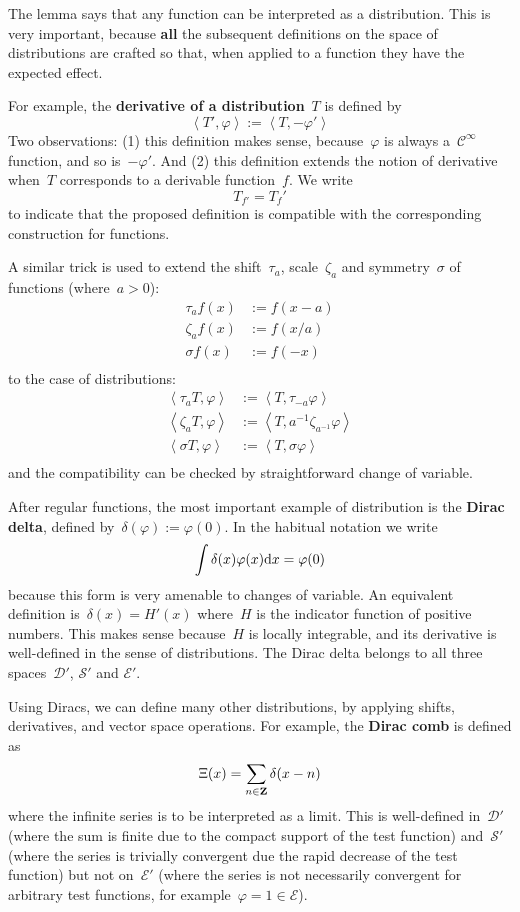 The lemma says that any function can be interpreted as a
distribution.
This is very important, because {\bf all} the subsequent
definitions on the space of distributions are crafted so that, when
applied to a function they have the expected effect.

For example, the {\bf derivative of a distribution}~$T$ is defined by
$$
\left<T',\varphi\right>
:=
\left<T,-\varphi'\right>
$$
Two observations: (1) this definition makes sense, because~$\varphi$
is always a~$\mathcal{C}^\infty$ function, and so is~$-\varphi'$.
And (2) this definition extends the notion of derivative when~$T$
corresponds to a derivable function~$f$.  We write
$$
T_{f'}= {T_f}'
$$
to indicate that the proposed definition is compatible with the
corresponding construction for functions.

A similar trick is used to extend the shift~$\tau_a$, scale~$\zeta_a$ and
symmetry~$\sigma$ of functions (where~$a>0$):
\begin{eqnarray*}
	\tau_a f(x) &:= f(x-a) \\
	\zeta_a f(x) &:= f(x/a) \\
	\sigma f(x) &:= f(-x) \\
\end{eqnarray*}
to the case of distributions:
\begin{eqnarray*}
	\left<\tau_a T,\varphi\right> &:= \left<T,\tau_{-a}\varphi\right> \\
	\left<\zeta_a T,\varphi\right> &:= \left<T,a^{-1}\zeta_{a^{-1}}\varphi\right> \\
	\left<\sigma T,\varphi\right> &:= \left<T,\sigma\varphi\right> \\
\end{eqnarray*}
and the compatibility can be checked by straightforward change of
variable.

After regular functions, the most important example of distribution
is the {\bf Dirac delta}, defined by~$\delta(\varphi):=\varphi(0)$.
In the habitual notation we write
$$
\int\delta(x)\varphi(x)\mathrm{d} x = \varphi(0)
$$
because this form is very amenable to changes of variable.
An equivalent definition is~$\delta(x)=H'(x)$ where~$H$ is the
indicator function of positive numbers.  This makes sense because~$H$
is locally integrable, and its derivative is well-defined in the
sense of distributions.  The Dirac delta belongs to all three
spaces~$\mathcal{D}'$, $\mathcal{S}'$ and $\mathcal{E}'$.

Using Diracs, we can define many other distributions, by applying
shifts, derivatives, and vector space operations.  For example, the
{\bf Dirac comb} is defined as
$$
\Xi(x)=\sum_{n\in\mathbf{Z}}\delta(x-n)
$$
where the infinite series is to be interpreted as a limit.  This is
well-defined in~$\mathcal{D}'$ (where the sum is finite due to the
compact support of the test function)
and~$\mathcal{S}'$ (where the series is trivially convergent due the
rapid decrease of the test function) but not on~$\mathcal{E}'$ (where
the series is not necessarily convergent for arbitrary test
functions, for example~$\varphi=1\in\mathcal{E}$).

